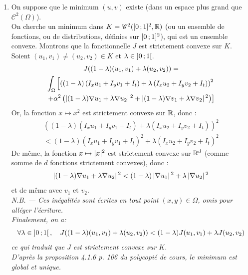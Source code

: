 \begin{enumerate}[questions]
\item On suppose que le minimum $(u,v)$ existe (dans un espace plus grand que $\mathscr{C}^2(\Omega)$). \\
On cherche un minimum dans $K = \mathscr{C}^2(\interff{0}{1}^2, \reels)$ (ou un ensemble de fonctions, ou de distributions, définies sur $\interff{0}{1}^2$), qui est un ensemble convexe. Montrons que la fonctionnelle $J$ est strictement convexe sur $K$.\\
Soient $(u_1, v_1) \neq (u_2, v_2) \in K$ et $\lambda \in \interoo{0}{1}$.
\begin{multline*}
J((1-\lambda)(u_1, v_1) + \lambda(u_2, v_2)) = \\
\int_{\Omega} \left[ \left( \left(1-\lambda\right) \left( I_x u_1 + I_y v_1 + I_t \right) + \lambda \left( I_x u_2 + I_y v_2 + I_t \right) \right)^2 \right. \\
\left. + \alpha^2 \left( \abs{(1-\lambda)\nabla u_1 + \lambda \nabla u_2}^2 + \abs{(1-\lambda)\nabla v_1 + \lambda \nabla v_2}^2 \right) \right]
\end{multline*}
Or, la fonction $x \mapsto x^2$ est strictement convexe sur $\mathbb{R}$, donc :
\begin{multline*}
\left( \left(1-\lambda\right) \left( I_x u_1 + I_y v_1 + I_t \right) + \lambda \left( I_x u_2 + I_y v_2 + I_t \right) \right)^2 \\
< (1-\lambda)\left( I_x u_1 + I_y v_1 + I_t \right)^2 + \lambda \left( I_x u_2 + I_y v_2 + I_t \right)^2
\end{multline*}
De même, la fonction $x \mapsto \abs{x}^2$ est strictement convexe sur $\mathbb{R}^d$ (comme somme de $d$ fonctions strictement convexes), donc :
\[ \abs{(1-\lambda)\nabla u_1 + \lambda \nabla u_2}^2 < (1-\lambda)\abs{\nabla u_1}^2 + \lambda\abs{\nabla u_2}^2 \]
et de même avec $v_1$ et $v_2$.\\
\itshape N.B. --- Ces inégalités sont écrites en tout point $(x,y) \in \Omega$, omis pour alléger l'écriture.\\ \upshape
Finalement, on a:
\[ \forall \lambda \in \interoo{0}{1}, \quad J((1-\lambda)(u_1, v_1) + \lambda(u_2, v_2)) < (1-\lambda)J(u_1, v_1) + \lambda J(u_2, v_2) \]
ce qui traduit que $J$ est strictement convexe sur $K$.\\
D'après la proposition 4.1.6 p. 106 du polycopié de cours, \emph{le minimum est global et unique}.



\end{enumerate}
